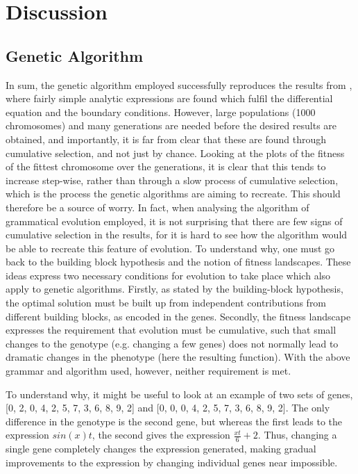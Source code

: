 \documentclass[multicolumn, 12pt]{extarticle}
\begin{document}
\section{Discussion}
\subsection{Genetic Algorithm}
In sum, the genetic algorithm employed successfully reproduces the results from \cite{Lagaris}, where fairly simple analytic expressions are found which fulfil the differential equation and the boundary conditions. However, large populations (1000 chromosomes) and many generations are needed before the desired results are obtained, and importantly, it is far from clear that these are found through cumulative selection, and not just by chance. Looking at the plots of the fitness of the fittest chromosome over the generations, it is clear that this tends to increase step-wise, rather than through a slow process of cumulative selection, which is the process the genetic algorithms are aiming to recreate. This should therefore be a source of worry. In fact, when analysing the algorithm of grammatical evolution employed, it is not surprising that there are few signs of cumulative selection in the results, for it is hard to see how the algorithm would be able to recreate this feature of evolution. To understand why, one must go back to the building block hypothesis and the notion of fitness landscapes. These ideas express two necessary conditions for evolution to take place which also apply to genetic algorithms. Firstly, as stated by the building-block hypothesis, the optimal solution must be built up from independent contributions from different building blocks, as encoded in the genes. Secondly, the fitness landscape expresses the requirement that evolution must be cumulative, such that small changes to the genotype (e.g. changing a few genes) does not normally lead to dramatic changes in the phenotype (here the resulting function). With the above grammar and algorithm used, however, neither requirement is met.

To understand why, it might be useful to look at an example of two sets of genes, [0, 2, 0, 4, 2, 5, 7, 3, 6, 8, 9, 2] and [0, 0, 0, 4, 2, 5, 7, 3, 6, 8, 9, 2]. The only difference in the genotype is the second gene, but whereas the first leads to the expression $sin(x)t$, the second gives the expression $\frac{xt}{6} + 2$. Thus, changing a single gene completely changes the expression generated, making gradual improvements to the expression by changing individual genes near impossible.
\end{document}
